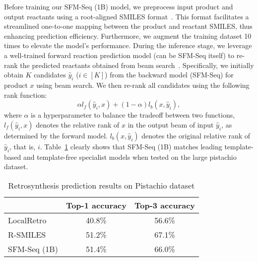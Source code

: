 Before training our SFM-Seq (1B) model, we preprocess input product and output reactants using a root-aligned SMILES format~\cite{Zhong2022rsmiles}.
This format facilitates a streamlined one-to-one mapping between the product and reactant SMILES, thus enhancing prediction efficiency.
Furthermore, we augment the training dataset 10 times to elevate the model's performance. 
During the inference stage, we leverage a well-trained forward reaction prediction model (can be SFM-Seq itself) to re-rank the predicted reactants obtained from beam search~\cite{lin2022improving, xia2017dual}.
Specifically, we initially obtain $K$ candidates $\hat{y}_i$ ($i\in [K]$) from the backward model (SFM-Seq) for product $x$ using beam search.
We then re-rank all candidates using the following rank function:
\begin{equation}
    \alpha l_{f}(\hat{y}_i, x) + (1-\alpha)l_{b}(x,\hat{y}_i),
\end{equation}
where $\alpha$ is a hyperparameter to balance the tradeoff between two functions, $l_{f}(\hat{y}_i, x)$ denotes the relative rank of $x$ in the output beam of input $\hat{y}_i$, as determined by the forward model.
$l_{b}(x, \hat{y}_i)$ denotes the original relative rank of $\hat{y}_i$, that is, $i$.
Table~\ref{tab:retro-pistachio} clearly shows that SFM-Seq (1B) matches leading template-based and template-free specialist models when tested on the large pistachio dataset.

\begin{table}[!h]

\centering
\begin{tabular}{lcc}
\toprule
& Top-1 accuracy & Top-3 accuracy \\
\midrule
LocalRetro~\cite{chen2021localretro} & 40.8\% & 56.6\% \\
R-SMILES~\cite{Zhong2022rsmiles} & 51.2\% & 67.1\% \\ 
\midrule
SFM-Seq (1B) & 51.4\% & 66.0\% \\
\bottomrule
\end{tabular}
\caption{Retrosynthesis prediction results on Pistachio dataset}
\label{tab:retro-pistachio}
\end{table}

